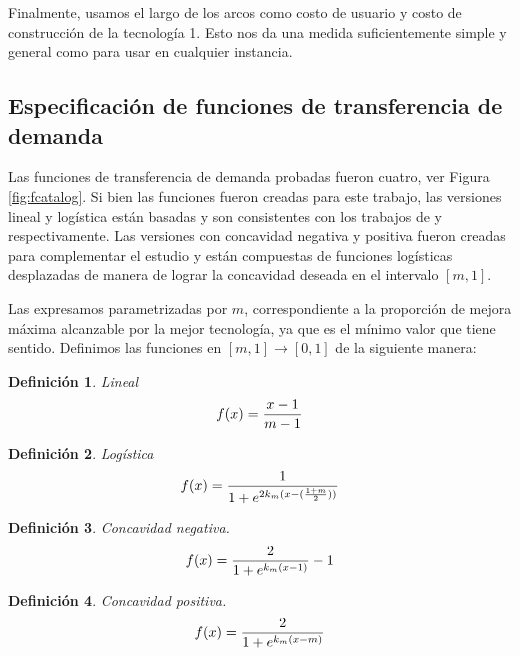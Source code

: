 \documentclass{article}
\newtheorem{definition}{Definición}
\begin{document}
  Finalmente, usamos el largo de los arcos como costo de usuario y costo de construcción de la tecnología 1. Esto nos da una medida suficientemente simple y general como para usar en cualquier instancia.

  \subsection{Especificación de funciones de transferencia de demanda}
  \label{sect:fspecification}

  Las funciones de transferencia de demanda probadas fueron cuatro, ver Figura \ref{fig:fcatalog}. Si bien las funciones fueron creadas para este trabajo, las versiones lineal y logística están basadas y son consistentes con los trabajos de \cite{shwe2014} y \cite{ortuz2011} respectivamente. Las versiones con concavidad negativa y positiva fueron creadas para complementar el estudio y están compuestas de funciones logísticas desplazadas de manera de lograr la concavidad deseada en el intervalo $[m, 1]$.

  Las expresamos parametrizadas por $m$, correspondiente a la proporción de mejora máxima alcanzable por la mejor tecnología, ya que es el mínimo valor que tiene sentido. Definimos las funciones en $[m, 1] \rightarrow [0, 1]$ de la siguiente manera:

  \begin{definition}
    Lineal
    \begin{align}
        f(x) = {x -1 \over m - 1}
    \end{align}
  \end{definition}

  \begin{definition}
    Logística
    \begin{align}
        f(x) = {1 \over 1 + e^{2k_m(x - ({1 + m \over 2}))}}
    \end{align}
  \end{definition}

  \begin{definition}
    Concavidad negativa.
    \begin{align}
        f(x) = {2 \over 1 + e^{k_m(x - 1)}} - 1
    \end{align}
  \end{definition}

  \begin{definition}
    Concavidad positiva.
    \begin{align}
        f(x) = {2 \over 1 + e^{k_m(x - m)}}
    \end{align}
  \end{definition}
\end{document}
